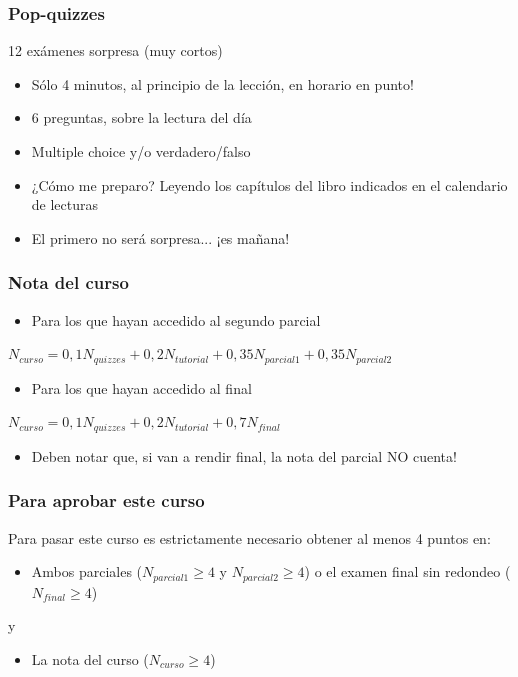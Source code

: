 \documentclass{beamer}
\begin{document}
\begin{frame}
\frametitle{Pop-quizzes}
12 exámenes sorpresa (muy cortos) \vspace{2mm}
\begin{itemize}
    \item Sólo 4 minutos, al principio de la lección, en horario en punto!
    \item 6 preguntas, sobre la lectura del día
    \item Multiple choice y/o verdadero/falso
    \item ¿Cómo me preparo? Leyendo los capítulos del libro indicados en el calendario de lecturas
    \item El primero no será sorpresa... ¡es mañana!
\end{itemize}
\end{frame}

\begin{frame}
\frametitle{Nota del curso}
\small
\begin{itemize}
    \item Para los que hayan accedido al segundo parcial \\
\end{itemize}
\begin{center}
 {$N_{curso}=0,1N_{quizzes}+0,2N_{tutorial}+0,35N_{parcial 1}+0,35N_{parcial 2}$}   
\end{center}

\begin{itemize}
    \item Para los que hayan accedido al final
\end{itemize}
\begin{center}
  {$N_{curso}=0,1N_{quizzes}+0,2N_{tutorial}+0,7N_{final}$}   
\end{center}

\begin{itemize}    
    \item Deben notar que, si van a rendir final, la nota del parcial NO cuenta!
\end{itemize}
\end{frame}

\begin{frame}
\frametitle{Para aprobar este curso}
Para pasar este curso es estrictamente necesario obtener al menos 4 puntos en:
\vspace{2mm}
\begin{itemize}
    \item Ambos parciales ($N_{parcial 1} \geq 4$ y $N_{parcial 2} \geq 4$) o el examen final sin redondeo ($N_{final} \geq 4$)
\end{itemize}
\centering y
\vspace{2mm}
\begin{itemize}
    \item La nota del curso ($N_{curso} \geq 4$)
\end{itemize}
\end{frame}
\end{document}
